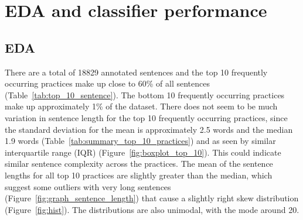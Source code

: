 
\chapter{EDA and classifier performance} %

\label{chapter3} %

\section{EDA}
There are a total of 18829 annotated sentences and the top 10 frequently occurring practices make up close to 60\% of all sentences (Table~\ref{tab:top_10_sentence}). The bottom 10 frequently occurring practices make up approximately 1\% of the dataset. There does not seem to be much variation in sentence length for the top 10 frequently occurring practices, since the standard deviation for the mean is approximately 2.5 words and the median 1.9 words (Table~\ref{tab:summary_top_10_practices}) and as seen by similar interquartile range (IQR) (Figure~\ref{fig:boxplot_top_10}). This could indicate similar sentence complexity across the practices. The mean of the sentence lengths for all top 10 practices are slightly greater than the median, which suggest some outliers with very long sentences (Figure~\ref{fig:graph_sentence_length}) that cause a slightly right skew distribution (Figure~\ref{fig:hist}). The distributions are also unimodal, with the mode around 20.

